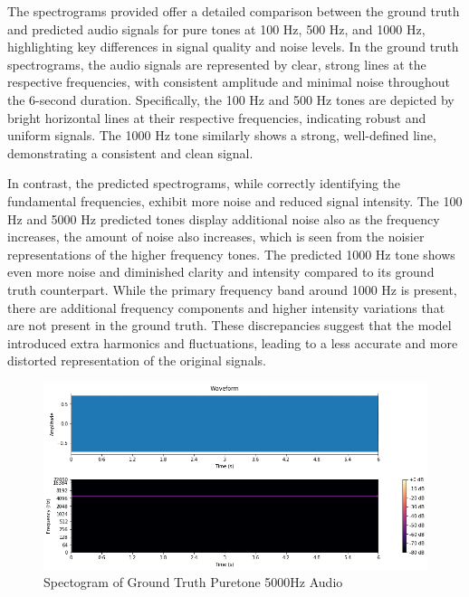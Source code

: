 \documentclass{ioereport}
\begin{document}
    
    The spectrograms provided offer a detailed comparison between the ground truth and predicted audio signals for pure tones at 100 Hz, 500 Hz, and 1000 Hz, highlighting key differences in signal quality and noise levels. In the ground truth spectrograms, the audio signals are represented by clear, strong lines at the respective frequencies, with consistent amplitude and minimal noise throughout the 6-second duration. Specifically, the 100 Hz and 500 Hz tones are depicted by bright horizontal lines at their respective frequencies, indicating robust and uniform signals. The 1000 Hz tone similarly shows a strong, well-defined line, demonstrating a consistent and clean signal.

    In contrast, the predicted spectrograms, while correctly identifying the fundamental frequencies, exhibit more noise and reduced signal intensity. The 100 Hz and 5000 Hz predicted tones display additional noise also as the frequency increases, the amount of noise also increases, which is seen from the noisier representations of the higher frequency tones. The predicted 1000 Hz tone shows even more noise and diminished clarity and intensity compared to its ground truth counterpart. While the primary frequency band around 1000 Hz is present, there are additional frequency components and higher intensity variations that are not present in the ground truth. These discrepancies suggest that the model introduced extra harmonics and fluctuations, leading to a less accurate and more distorted representation of the original signals. 

    \begin{figure}[H]
        \centering
        \includegraphics[width=\linewidth]{assets/audio_results/puretone5000hz.png}
        \caption{Spectogram of Ground Truth Puretone 5000Hz Audio}
        \label{fig:gt-pure5000-spec}
    \end{figure}
    
\end{document}
